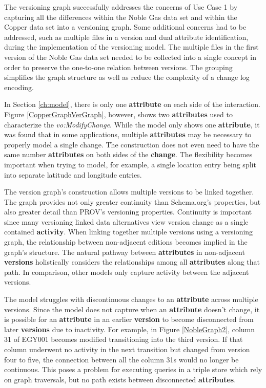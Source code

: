 The versioning graph successfully addresses the concerns of Use Case 1 by capturing all the differences within the Noble Gas data set and within the Copper data set into a versioning graph.
Some additional concerns had to be addressed, such as multiple files in a version and dual attribute identification, during the implementation of the versioning model.
The multiple files in the first version of the Noble Gas data set needed to be collected into a single concept in order to preserve the one-to-one relation between versions.
The grouping simplifies the graph structure as well as reduce the complexity of a change log encoding.

In Section \ref{ch:model}, there is only one \textbf{attribute} on each side of the interaction.
Figure \ref{CopperGraphVerGraph}, however, shows two \textbf{attributes} used to characterize the \textit{vo:ModifyChange}.
While the model only shows one \textbf{attribute}, it was found that in some applications, multiple \textbf{attributes} may be necessary to properly model a single change.
The construction does not even need to have the same number \textbf{attributes} on both sides of the \textbf{change}.
The flexibility becomes important when trying to model, for example, a single location entry being split into separate latitude and longitude entries.

The version graph's construction allows multiple versions to be linked together.
The graph provides not only greater continuity than Schema.org's properties, but also greater detail than PROV's versioning properties.
Continuity is important since many versioning linked data alternatives view version change as a single contained \textbf{activity}.
When linking together multiple versions using a versioning graph, the relationship between non-adjacent editions becomes implied in the graph's structure.
The natural pathway between \textbf{attributes} in non-adjacent \textbf{versions} holistically considers the relationships among all \textbf{attributes} along that path.
In comparison, other models only capture activity between the adjacent versions.

The model struggles with discontinuous changes to an \textbf{attribute} across multiple versions.
Since the model does not capture when an \textbf{attribute} doesn't change, it is possible for an \textbf{attribute} in an earlier \textbf{version} to become disconnected from later \textbf{versions} due to inactivity.
For example, in Figure \ref{NobleGraph2}, column 31 of EGY001 becomes modified transitioning into the third version.
If that column underwent no activity in the next transition but changed from version four to five, the connection between all the column 31s would no longer be continuous.
This poses a problem for executing queries in a triple store which rely on graph traversals, but no path exists between disconnected \textbf{attributes}.

